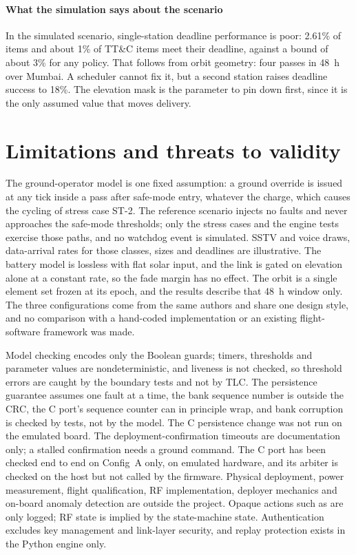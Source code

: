 \documentclass[preprint,12pt]{elsarticle}
\newcommand{\cfgA}{Config~A}
\newcommand{\ttc}{TT\&C}
\begin{document}
\paragraph{What the simulation says about the scenario} In the simulated scenario, single-station deadline performance is poor: 2.61\% of items and about 1\% of \ttc{} items meet their deadline, against a bound of about 3\% for any policy. That follows from orbit geometry: four passes in 48~h over Mumbai. A scheduler cannot fix it, but a second station raises deadline success to 18\%. The elevation mask is the parameter to pin down first, since it is the only assumed value that moves delivery.

\section{Limitations and threats to validity}\label{sec:limitations}

The ground-operator model is one fixed assumption: a ground override is issued at any tick inside a pass after safe-mode entry, whatever the charge, which causes the cycling of stress case ST-2. The reference scenario injects no faults and never approaches the safe-mode thresholds; only the stress cases and the engine tests exercise those paths, and no watchdog event is simulated. SSTV and voice draws, data-arrival rates for those classes, sizes and deadlines are illustrative. The battery model is lossless with flat solar input, and the link is gated on elevation alone at a constant rate, so the fade margin has no effect. The orbit is a single element set frozen at its epoch, and the results describe that 48~h window only. The three configurations come from the same authors and share one design style, and no comparison with a hand-coded implementation or an existing flight-software framework was made.

Model checking encodes only the Boolean guards; timers, thresholds and parameter values are nondeterministic, and liveness is not checked, so threshold errors are caught by the boundary tests and not by TLC. The persistence guarantee assumes one fault at a time, the bank sequence number is outside the CRC, the C port's sequence counter can in principle wrap, and bank corruption is checked by tests, not by the model. The C persistence change was not run on the emulated board. The deployment-confirmation timeouts are documentation only; a stalled confirmation needs a ground command. The C port has been checked end to end on \cfgA{} only, on emulated hardware, and its arbiter is checked on the host but not called by the firmware. Physical deployment, power measurement, flight qualification, RF implementation, deployer mechanics and on-board anomaly detection are outside the project. Opaque actions such as  are only logged; RF state is implied by the state-machine state. Authentication excludes key management and link-layer security, and replay protection exists in the Python engine only.
\end{document}
